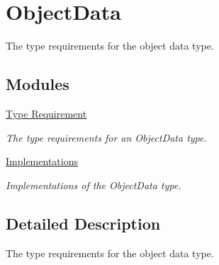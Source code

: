 \hypertarget{group__object__data}{\section{Object\-Data}
\label{group__object__data}
}


The type requirements for the object data type.  


\subsection*{Modules}
\begin{DoxyCompactItemize}
\item 
\hyperlink{group__object__data__type}{Type Requirement}
\begin{DoxyCompactList}\small\item\em The type requirements for an Object\-Data type. \end{DoxyCompactList}\item 
\hyperlink{group__object__data__implementation}{Implementations}
\begin{DoxyCompactList}\small\item\em Implementations of the Object\-Data type. \end{DoxyCompactList}\end{DoxyCompactItemize}


\subsection{Detailed Description}
The type requirements for the object data type. 